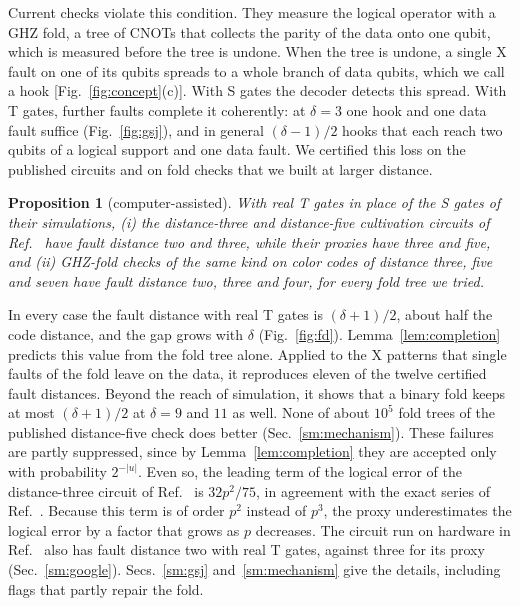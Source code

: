 \documentclass[aps,prl,reprint,twocolumn,amsmath,amssymb,floatfix,nofootinbib,superscriptaddress]{revtex4-2}
\newtheorem{proposition}[theorem]{Proposition}
\theoremstyle{definition}
\theoremstyle{remark}
\begin{document}
Current checks violate this condition. They measure the logical operator with a GHZ fold, a tree of CNOTs that collects the parity of the data onto one qubit, which is measured before the tree is undone. When the tree is undone, a single X fault on one of its qubits spreads to a whole branch of data qubits, which we call a hook [Fig.~\ref{fig:concept}(c)]. With S gates the decoder detects this spread. With T gates, further faults complete it coherently: at $\delta=3$ one hook and one data fault suffice (Fig.~\ref{fig:gsj}), and in general $(\delta-1)/2$ hooks that each reach two qubits of a logical support and one data fault. We certified this loss on the published circuits and on fold checks that we built at larger distance.
\begin{proposition}[computer-assisted]\label{prop:gsj}\label{prop:fold}
With real T gates in place of the S gates of their simulations, (i) the distance-three and distance-five cultivation circuits of Ref.~\cite{cultivation} have fault distance two and three, while their proxies have three and five, and (ii) GHZ-fold checks of the same kind on color codes of distance three, five and seven have fault distance two, three and four, for every fold tree we tried.
\end{proposition}
In every case the fault distance with real T gates is $(\delta+1)/2$, about half the code distance, and the gap grows with $\delta$ (Fig.~\ref{fig:fd}). Lemma~\ref{lem:completion} predicts this value from the fold tree alone. Applied to the X patterns that single faults of the fold leave on the data, it reproduces eleven of the twelve certified fault distances. Beyond the reach of simulation, it shows that a binary fold keeps at most $(\delta+1)/2$ at $\delta=9$ and $11$ as well. None of about $10^5$ fold trees of the published distance-five check does better (Sec.~\ref{sm:mechanism}). These failures are partly suppressed, since by Lemma~\ref{lem:completion} they are accepted only with probability $2^{-|u|}$. Even so, the leading term of the logical error of the distance-three circuit of Ref.~\cite{cultivation} is $32p^2/75$, in agreement with the exact series of Ref.~\cite{wanzapirain}. Because this term is of order $p^2$ instead of $p^3$, the proxy underestimates the logical error by a factor that grows as $p$ decreases. The circuit run on hardware in Ref.~\cite{googlecultivation} also has fault distance two with real T gates, against three for its proxy (Sec.~\ref{sm:google}). Secs.~\ref{sm:gsj} and~\ref{sm:mechanism} give the details, including flags that partly repair the fold.
\end{document}

